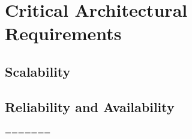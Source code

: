 \documentclass[a4paper,12pt,titlepage]{article}
\begin{document}


\tableofcontents
\newpage



\section{Critical Architectural Requirements}




\subsection{Scalability}


\subsection{Reliability and Availability}

=======







\end{document}
